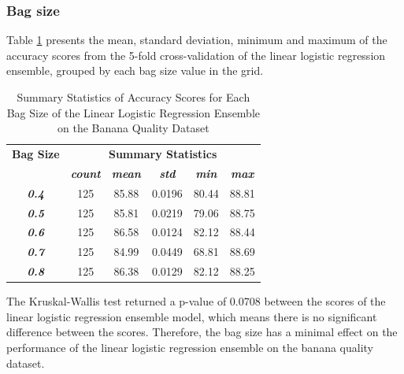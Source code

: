 \documentclass[10pt, conference]{IEEEtran}
\begin{document}
\subsubsection{Bag size}

Table \ref{table: BQ_bagsize_linear_performance_metrics} presents the mean, standard deviation, minimum and maximum of the
accuracy scores from the 5-fold cross-validation of the linear logistic regression ensemble, grouped by each bag size
value in the grid.
\begin{table}[H]
    \caption{Summary Statistics of Accuracy Scores for Each Bag Size of the Linear Logistic Regression Ensemble on the Banana Quality Dataset}
    \begin{center}
        \begin{tabular}{|c||c|c|c|c|c|}
            \hline
            \textbf{Bag Size}&\multicolumn{5}{|c|}{\textbf{Summary Statistics}} \\
            \cline{2-6}
                       &\textbf{\textit{count}} & \textbf{\textit{mean}} & \textbf{\textit{std}} & \textbf{\textit{min}} & \textbf{\textit{max}}\\
            \hline
            \textbf{\textit{0.4}} & 125 & 85.88 & 0.0196 & 80.44 & 88.81 \\
            \textbf{\textit{0.5}} & 125 & 85.81 & 0.0219 & 79.06 & 88.75 \\
            \textbf{\textit{0.6}} & 125 & 86.58 & 0.0124 & 82.12 & 88.44 \\
            \textbf{\textit{0.7}} & 125 & 84.99 & 0.0449 & 68.81 & 88.69 \\
            \textbf{\textit{0.8}} & 125 & 86.38 & 0.0129 & 82.12 & 88.25 \\
            \hline
        \end{tabular}
    \end{center}
    \label{table: BQ_bagsize_linear_performance_metrics}
\end{table}
The Kruskal-Wallis test returned a p-value of 0.0708 between the scores of the linear logistic regression ensemble model,
which means there is no significant difference between the scores. Therefore, the bag size has a minimal effect on the
performance of the linear logistic regression ensemble on the banana quality dataset.
\end{document}
